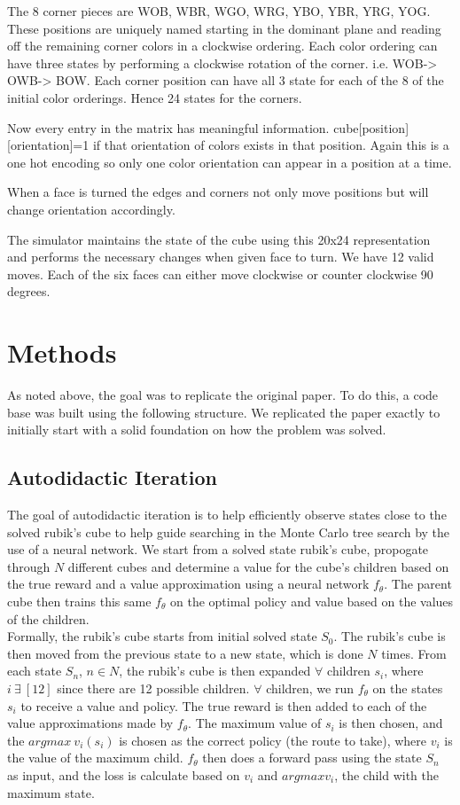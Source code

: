 \documentclass[10pt,twocolumn,letterpaper]{article}
\begin{document}
The 8 corner pieces are WOB, WBR, WGO, WRG, YBO, YBR, YRG, YOG.  These positions are uniquely named starting in the dominant plane and reading off the remaining corner colors in a clockwise ordering.  Each color ordering can have three states by performing a clockwise rotation of the corner.  i.e. WOB-> OWB-> BOW.  Each corner position can have all 3 state for each of the 8 of the initial color orderings.  Hence 24 states for the corners. 

Now every entry in the matrix has meaningful information.  cube[position][orientation]=1 if that orientation of colors exists in that position.  Again this is a one hot encoding so only one color orientation can appear in a position at a time. 

When a face is turned the edges and corners not only move positions but will change orientation accordingly.  

The simulator maintains the state of the cube using this 20x24 representation and performs the necessary changes when given face to turn.  We have 12 valid moves.  Each of the six faces can either move clockwise or counter clockwise 90 degrees. 


\section{Methods}
As noted above, the goal was to replicate the original paper. To do this, a code base was built using the following structure. We replicated the paper exactly to initially start with a solid foundation on how the problem was solved.

\subsection{Autodidactic Iteration}
The goal of autodidactic iteration is to help efficiently observe states close to the solved rubik's cube to help guide searching in the Monte Carlo tree search by the use of a neural network. We start from a solved state rubik's cube, propogate through $N$ different cubes and determine a value for the cube's children based on the true reward and a value approximation using a neural network $f_\theta$.  The parent cube then trains this same $f_\theta$ on the optimal policy and value based on the values of the children. 
\\

Formally, the rubik's cube starts from initial solved state $S_0$. The rubik's cube is then moved from the previous state to a new state, which is done $N$ times. From each state $S_n$, $n \in N$, the rubik's cube is then expanded $\forall$ children $s_i$, where $i \ \exists \ [12]$ since there are 12 possible children. $\forall$ children, we run $f_\theta$ on the states $s_i$ to receive a value and policy. The true reward is then added to each of the value approximations made by $f_\theta$. 
The maximum value of $s_i$ is then chosen, and the $argmax \ v_i(s_i)$ is chosen as the correct policy (the route to take), where $v_i$ is the value of the maximum child. $f_\theta$ then does a forward pass using the state $S_n$ as input, and the loss is calculate based on $v_i$ and $argmax v_i$, the child with the maximum state.
\end{document}
